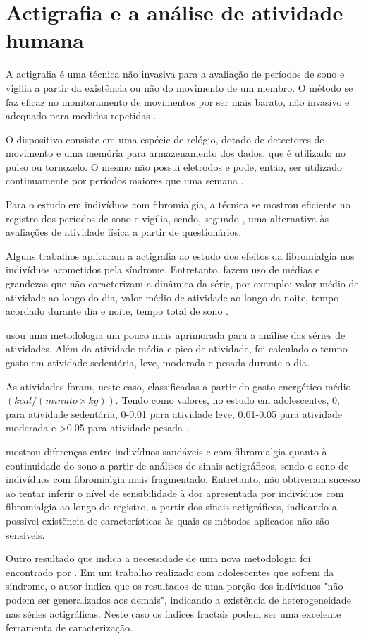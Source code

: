 \documentclass{ufscThesis}
\begin{document}
\section{Actigrafia e a análise de atividade humana}

A actigrafia é uma técnica não invasiva para a avaliação de períodos de sono e vigília a partir da existência ou não do movimento de um membro. O método se faz eficaz no monitoramento de movimentos por ser mais barato, não invasivo e adequado para medidas repetidas \cite{Lichstein2006}. \par
O dispositivo consiste em uma espécie de relógio, dotado de detectores de movimento e uma memória para armazenamento dos dados, que é utilizado no pulso ou tornozelo. O mesmo não possui eletrodos e pode, então, ser utilizado continuamente por períodos maiores que uma semana \cite{Lichstein2006}. \par
Para o estudo em indivíduos com fibromialgia, a técnica se mostrou eficiente no registro dos períodos de sono e vigília, sendo, segundo , uma alternativa às avaliações de atividade física a partir de questionários.\par
Alguns trabalhos aplicaram a actigrafia ao estudo dos efeitos da fibromialgia nos indivíduos acometidos pela síndrome. Entretanto, fazem uso de médias e grandezas que não caracterizam a dinâmica da série, por exemplo: valor médio de atividade ao longo do dia, valor médio de atividade ao longo da noite, tempo acordado durante dia e noite, tempo total de sono \cite{Korszun2002,Okifuji2011,Anderson2012}.\par
{} usou uma metodologia um pouco mais aprimorada para a análise das séries de atividades. Além da atividade média e pico de atividade, foi calculado o tempo gasto em atividade sedentária, leve, moderada e pesada durante o dia. \par
As atividades foram, neste caso, classificadas a partir do gasto energético médio $(kcal/(minuto \times kg))$. Tendo como valores, no estudo em adolescentes, 0, para atividade sedentária, 0-0.01 para atividade leve, 0.01-0.05 para atividade moderada e >0.05 para atividade pesada \cite{Kashikar-Zuck2013}.\par
{} mostrou diferenças entre indivíduos saudáveis e com fibromialgia quanto à continuidade do sono a partir de análises de sinais actigráficos, sendo o sono de indivíduos com fibromialgia mais fragmentado. Entretanto,  não obtiveram sucesso ao tentar inferir o nível de sensibilidade à dor apresentada por indivíduos com fibromialgia ao longo do registro, a partir dos sinais actigráficos, indicando a possível existência de características às quais os métodos aplicados não são sensíveis.\par
Outro resultado que indica a necessidade de uma nova metodologia foi encontrado por . Em um trabalho realizado com adolescentes que sofrem da síndrome, o autor indica que os resultados de uma porção dos indívíduos "não podem ser generalizados aos demais", indicando a existência de heterogeneidade nas séries actigráficas. Neste caso os índices fractais podem ser uma excelente ferramenta de caracterização.
\end{document}
